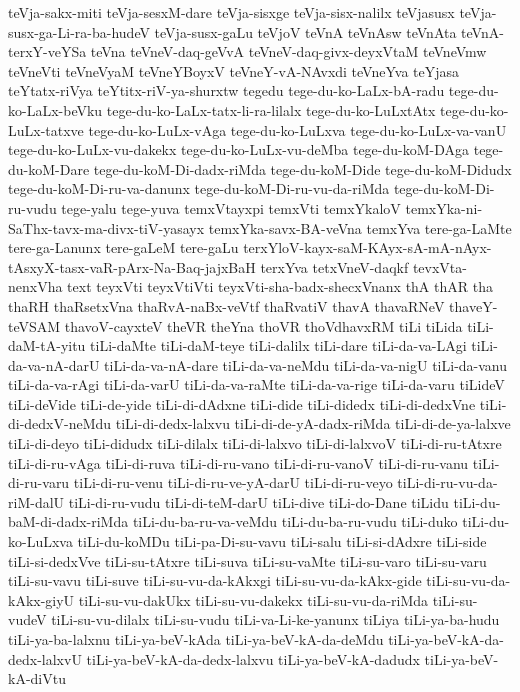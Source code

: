 {teVja-sakx-miti
teVja-sesxM-dare
teVja-sisxge
teVja-sisx-nalilx
teVjasusx
teVja-susx-ga-Li-ra-ba-hudeV
teVja-susx-gaLu
teVjoV
teVnA
teVnAsw
teVnAta
teVnA-terxY-veYSa
teVna
teVneV-daq-geVvA
teVneV-daq-givx-deyxVtaM
teVneVmw
teVneVti
teVneVyaM
teVneYBoyxV
teVneY-vA-NAvxdi
teVneYva
teYjasa
teYtatx-riVya
teYtitx-riV-ya-shurxtw
tegedu
tege-du-ko-LaLx-bA-radu
tege-du-ko-LaLx-beVku
tege-du-ko-LaLx-tatx-li-ra-lilalx
tege-du-ko-LuLxtAtx
tege-du-ko-LuLx-tatxve
tege-du-ko-LuLx-vAga
tege-du-ko-LuLxva
tege-du-ko-LuLx-va-vanU
tege-du-ko-LuLx-vu-dakekx
tege-du-ko-LuLx-vu-deMba
tege-du-koM-DAga
tege-du-koM-Dare
tege-du-koM-Di-dadx-riMda
tege-du-koM-Dide
tege-du-koM-Didudx
tege-du-koM-Di-ru-va-danunx
tege-du-koM-Di-ru-vu-da-riMda
tege-du-koM-Di-ru-vudu
tege-yalu
tege-yuva
temxVtayxpi
temxVti
temxYkaloV
temxYka-ni-SaThx-tavx-ma-divx-tiV-yasayx
temxYka-savx-BA-veVna
temxYva
tere-ga-LaMte
tere-ga-Lanunx
tere-gaLeM
tere-gaLu
terxYloV-kayx-saM-KAyx-sA-mA-nAyx-tAsxyX-tasx-vaR-pArx-Na-Baq-jajxBaH
terxYva
tetxVneV-daqkf
tevxVta-nenxVha
text
teyxVti
teyxVtiVti
teyxVti-sha-badx-shecxVnanx
thA
thAR
tha
thaRH
thaRsetxVna
thaRvA-naBx-veVtf
thaRvatiV
thavA
thavaRNeV
thaveY-teVSAM
thavoV-cayxteV
theVR
theYna
thoVR
thoVdhavxRM
tiLi
tiLida
tiLi-daM-tA-yitu
tiLi-daMte
tiLi-daM-teye
tiLi-dalilx
tiLi-dare
tiLi-da-va-LAgi
tiLi-da-va-nA-darU
tiLi-da-va-nA-dare
tiLi-da-va-neMdu
tiLi-da-va-nigU
tiLi-da-vanu
tiLi-da-va-rAgi
tiLi-da-varU
tiLi-da-va-raMte
tiLi-da-va-rige
tiLi-da-varu
tiLideV
tiLi-deVide
tiLi-de-yide
tiLi-di-dAdxne
tiLi-dide
tiLi-didedx
tiLi-di-dedxVne
tiLi-di-dedxV-neMdu
tiLi-di-dedx-lalxvu
tiLi-di-de-yA-dadx-riMda
tiLi-di-de-ya-lalxve
tiLi-di-deyo
tiLi-didudx
tiLi-dilalx
tiLi-di-lalxvo
tiLi-di-lalxvoV
tiLi-di-ru-tAtxre
tiLi-di-ru-vAga
tiLi-di-ruva
tiLi-di-ru-vano
tiLi-di-ru-vanoV
tiLi-di-ru-vanu
tiLi-di-ru-varu
tiLi-di-ru-venu
tiLi-di-ru-ve-yA-darU
tiLi-di-ru-veyo
tiLi-di-ru-vu-da-riM-dalU
tiLi-di-ru-vudu
tiLi-di-teM-darU
tiLi-dive
tiLi-do-Dane
tiLidu
tiLi-du-baM-di-dadx-riMda
tiLi-du-ba-ru-va-veMdu
tiLi-du-ba-ru-vudu
tiLi-duko
tiLi-du-ko-LuLxva
tiLi-du-koMDu
tiLi-pa-Di-su-vavu
tiLi-salu
tiLi-si-dAdxre
tiLi-side
tiLi-si-dedxVve
tiLi-su-tAtxre
tiLi-suva
tiLi-su-vaMte
tiLi-su-varo
tiLi-su-varu
tiLi-su-vavu
tiLi-suve
tiLi-su-vu-da-kAkxgi
tiLi-su-vu-da-kAkx-gide
tiLi-su-vu-da-kAkx-giyU
tiLi-su-vu-dakUkx
tiLi-su-vu-dakekx
tiLi-su-vu-da-riMda
tiLi-su-vudeV
tiLi-su-vu-dilalx
tiLi-su-vudu
tiLi-va-Li-ke-yanunx
tiLiya
tiLi-ya-ba-hudu
tiLi-ya-ba-lalxnu
tiLi-ya-beV-kAda
tiLi-ya-beV-kA-da-deMdu
tiLi-ya-beV-kA-da-dedx-lalxvU
tiLi-ya-beV-kA-da-dedx-lalxvu
tiLi-ya-beV-kA-dadudx
tiLi-ya-beV-kA-diVtu
}
